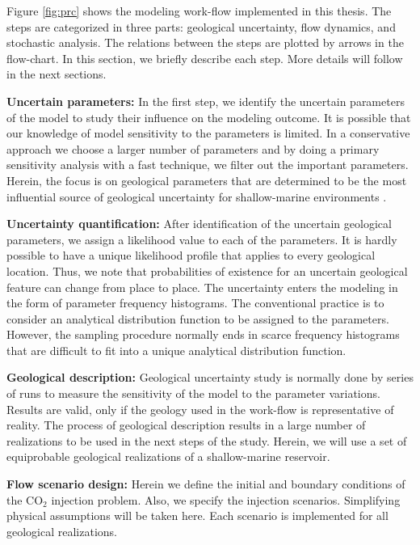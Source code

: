 Figure \ref{fig:prc} shows the modeling work-flow implemented in this thesis. The steps are categorized in three parts: geological uncertainty,
flow dynamics, and stochastic analysis. The relations between the steps are plotted by arrows in the flow-chart. In this section, we briefly describe each step. More details will follow in the next sections.

\textbf{Uncertain parameters:} In the first step, we identify the uncertain
parameters of the model  to study their influence on the modeling outcome. It is possible that our knowledge of model sensitivity to the parameters is limited. In a conservative approach we choose a larger number of parameters and by doing a primary sensitivity analysis with a fast technique, we filter out the important parameters. Herein, the focus is on geological parameters that are determined to be the most influential source of geological uncertainty for shallow-marine environments \cite{howell2008sedimentological}.

\textbf{Uncertainty quantification:} After identification of the uncertain
geological parameters, we assign a likelihood value to each of the parameters. It is hardly possible to have a unique likelihood profile that applies to every
geological location. Thus, we note that probabilities of existence for an
uncertain geological feature can change from place to place. The uncertainty
enters the modeling in the form of parameter frequency histograms. The
conventional practice is to consider an analytical distribution function to be
assigned to the parameters. However, the sampling procedure normally ends in
scarce frequency histograms that are difficult to fit into a unique analytical
distribution function.

\textbf{Geological description:} Geological uncertainty study is normally done
by series of runs to measure the sensitivity of the model to the parameter
variations. Results are valid, only if the geology used in the work-flow is
representative of reality. The process of geological description results in a
large number of realizations to be used in the next steps of the study. Herein, we will use a set of equiprobable geological realizations of a shallow-marine reservoir.

\textbf{Flow scenario design:} Herein we define the initial and boundary
conditions of the $\mbox{CO}_2$ injection problem. Also, we specify the
injection scenarios. Simplifying physical assumptions will be taken
here. Each scenario is implemented for all geological realizations.

